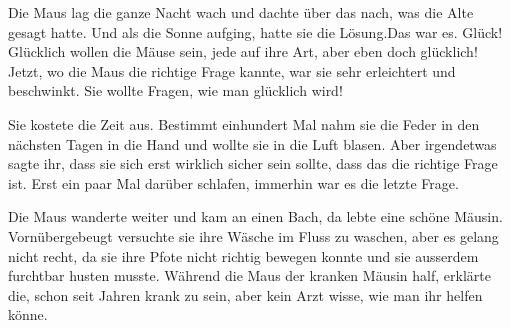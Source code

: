 Die Maus lag die ganze Nacht wach und dachte über das nach, was die Alte gesagt hatte. Und als die Sonne aufging, hatte sie die Lösung.Das war es. Glück! Glücklich wollen die Mäuse sein, jede auf ihre Art, aber eben doch glücklich! Jetzt, wo die Maus die richtige Frage kannte, war sie sehr erleichtert und beschwinkt. Sie wollte Fragen, wie man glücklich wird! 

Sie kostete die Zeit aus. Bestimmt einhundert Mal nahm sie die Feder in den nächsten Tagen in die Hand und wollte sie in die Luft blasen. Aber irgendetwas sagte ihr, dass sie sich erst wirklich sicher sein sollte, dass das die richtige Frage ist. Erst ein paar Mal darüber schlafen, immerhin war es die letzte Frage.

Die Maus wanderte weiter und kam an einen Bach, da lebte eine schöne Mäusin. Vornübergebeugt versuchte sie ihre Wäsche im Fluss zu waschen, aber es gelang nicht recht, da sie ihre Pfote nicht richtig bewegen konnte und sie ausserdem furchtbar husten musste. Während die Maus der kranken Mäusin half, erklärte die, schon seit Jahren krank zu sein, aber kein Arzt wisse, wie man ihr helfen könne.


